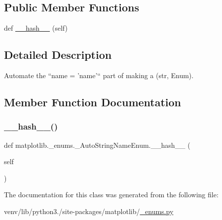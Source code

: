 \subsection*{Public Member Functions}
\begin{DoxyCompactItemize}
\item 
def \hyperlink{classmatplotlib_1_1__enums_1_1__AutoStringNameEnum_a3bde451162cc90282da75a371a061374}{\+\_\+\+\_\+hash\+\_\+\+\_\+} (self)
\end{DoxyCompactItemize}


\subsection{Detailed Description}
\begin{DoxyVerb}Automate the ``name = 'name'`` part of making a (str, Enum).\end{DoxyVerb}
 

\subsection{Member Function Documentation}
\mbox{\label{classmatplotlib_1_1__enums_1_1__AutoStringNameEnum_a3bde451162cc90282da75a371a061374}} 
\subsubsection{\texorpdfstring{\+\_\+\+\_\+hash\+\_\+\+\_\+()}{\_\_hash\_\_()}}
{\footnotesize\ttfamily def matplotlib.\+\_\+enums.\+\_\+\+Auto\+String\+Name\+Enum.\+\_\+\+\_\+hash\+\_\+\+\_\+ (\begin{DoxyParamCaption}\item[{}]{self }\end{DoxyParamCaption})}



The documentation for this class was generated from the following file\+:\begin{DoxyCompactItemize}
\item 
venv/lib/python3./site-\/packages/matplotlib/\hyperlink{__enums_8py}{\+\_\+enums.\+py}\end{DoxyCompactItemize}
